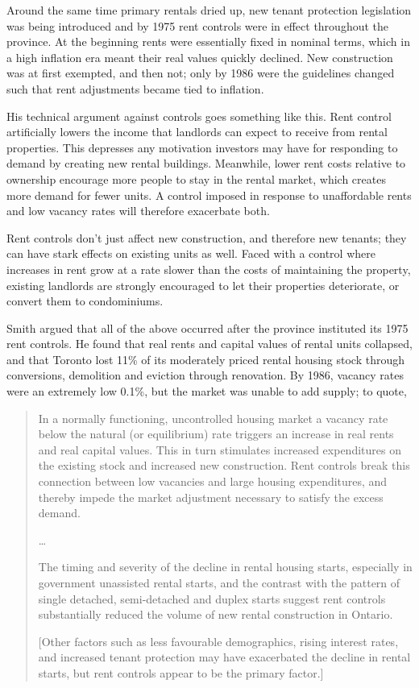 Around the same time primary rentals dried up, new tenant protection legislation was being introduced and by 1975 rent controls were in effect throughout the province. At the beginning rents were essentially fixed in nominal terms, which in a high inflation era meant their real values quickly declined. New construction was at first exempted, and then not; only by 1986 were the guidelines changed such that rent adjustments became tied to inflation.\cite{smith-1988}

His technical argument against controls goes something like this. Rent control artificially lowers the income that landlords can expect to receive from rental properties. This depresses any motivation investors may have for responding to demand by creating new rental buildings. Meanwhile, lower rent costs relative to ownership encourage more people to stay in the rental market, which creates more demand for fewer units. A control imposed in response to unaffordable rents and low vacancy rates will therefore exacerbate both.

Rent controls don't just affect new construction, and therefore new tenants; they can have stark effects on existing units as well. Faced with a control where increases in rent grow at a rate slower than the costs of maintaining the property, existing landlords are strongly encouraged to let their properties deteriorate, or convert them to condominiums. 

Smith argued that all of the above occurred after the province instituted its 1975 rent controls. He found that real rents and capital values of rental units collapsed, and that Toronto lost 11\% of its moderately priced rental housing stock through conversions, demolition and eviction through renovation. By 1986, vacancy rates were an extremely low 0.1\%, but the market was unable to add supply; to quote,

\begin{quote}
In a normally functioning, uncontrolled housing market a vacancy rate below the natural (or equilibrium) rate triggers an increase in real rents and real capital values. This in turn stimulates increased expenditures on the existing stock and increased new construction. Rent controls break this connection between low vacancies and large housing expenditures, and thereby impede the market adjustment necessary to satisfy the excess demand.

…

The timing and severity of the decline in rental housing starts, especially in government unassisted rental starts, and the contrast with the pattern of single detached, semi-detached and duplex starts suggest rent controls substantially reduced the volume of new rental construction in Ontario.

[Other factors such as less favourable demographics, rising interest rates, and increased tenant protection may have exacerbated the decline in rental starts, but rent controls appear to be the primary factor.] \cite{smith-1988}
\end{quote}


